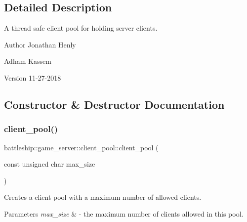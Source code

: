 \subsection{Detailed Description}
A thread safe client pool for holding server clients. 

\begin{DoxyAuthor}{Author}
Jonathan Henly 

Adham Kassem 
\end{DoxyAuthor}
\begin{DoxyVersion}{Version}
11-\/27-\/2018 
\end{DoxyVersion}


\subsection{Constructor \& Destructor Documentation}
\mbox{\label{classbattleship_1_1game__server_1_1client__pool_a9ffedd30a826545efa028e0043e9fe76}} 
\subsubsection{\texorpdfstring{client\+\_\+pool()}{client\_pool()}}
{\footnotesize\ttfamily battleship\+::game\+\_\+server\+::client\+\_\+pool\+::client\+\_\+pool (\begin{DoxyParamCaption}\item[{const unsigned char}]{max\+\_\+size }\end{DoxyParamCaption})\hspace{0.3cm}{\ttfamily [explicit]}}

Creates a client pool with a maximum number of allowed clients.


\begin{DoxyParams}{Parameters}
{\em max\+\_\+size} & -\/ the maximum number of clients allowed in this pool. \\
\hline
\end{DoxyParams}
\mbox{\label{classbattleship_1_1game__server_1_1client__pool_abf33396f0871941b9adda5e7e2cab62a}} 
